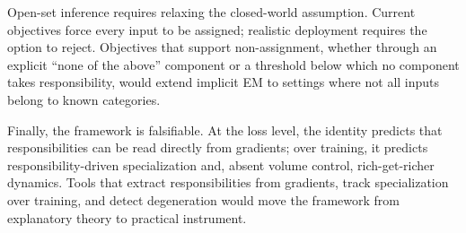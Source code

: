 Open-set inference requires relaxing the closed-world assumption. Current objectives force every input to be assigned; realistic deployment requires the option to reject. Objectives that support non-assignment, whether through an explicit ``none of the above'' component or a threshold below which no component takes responsibility, would extend implicit EM to settings where not all inputs belong to known categories.

Finally, the framework is falsifiable. At the loss level, the identity predicts that responsibilities can be read directly from gradients; over training, it predicts responsibility-driven specialization and, absent volume control, rich-get-richer dynamics. Tools that extract responsibilities from gradients, track specialization over training, and detect degeneration would move the framework from explanatory theory to practical instrument.
